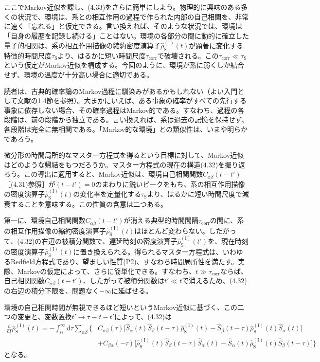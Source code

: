 \hypertarget{srcpage:163}{}\label{srcpage:163}
ここでMarkov近似を課し、(4.33)をさらに簡単にしよう。物理的に興味のある多くの状況で、環境は、系との相互作用の過程で作られた内部の自己相関を、非常に速く「忘れる」と仮定できる。言い換えれば、そのような状況では、環境は「自身の履歴を記録し続ける」ことはない。環境の各部分の間に動的に確立した量子的相関は、系の相互作用描像の縮約密度演算子$\hat\rho^{(\mathrm I)}_{\mathrm S}(t)$が顕著に変化する特徴的時間尺度$\tau_{\mathrm S}$より、はるかに短い時間尺度$\tau_{\mathrm{corr}}$で破壊される。この$\tau_{\mathrm{corr}}\ll\tau_{\mathrm S}$という仮定がMarkov近似を構成する。今回のように、環境が系に弱くしか結合せず、環境の温度が十分高い場合に適切である。

読者は、古典的確率論のMarkov過程に馴染みがあるかもしれない（よい入門として文献\cite{ref018}の1.4節を参照）。大まかにいえば、ある事象の確率がすべての先行する事象に依存しない場合、その確率過程はMarkov的である。すなわち、過程の各段階は、前の段階から独立である。言い換えれば、系は過去の記憶を保持せず、各段階は完全に無相関である。「Markov的な環境」との類似性は、いまや明らかであろう。

微分形の時間局所的なマスター方程式を得るという目標に対して、Markov近似はどのような帰結をもつだろうか。マスター方程式の現在の構造(4.32)を振り返ろう。この導出に適用すると、Markov近似は、環境自己相関関数$C_{\alpha\beta}(t-t')$［(4.31)参照］が$(t-t')=0$のまわりに鋭いピークをもち、系の相互作用描像の密度演算子$\hat\rho^{(\mathrm I)}_{\mathrm S}(t)$の変化率を定量化する$\tau_{\mathrm S}$より、はるかに短い時間尺度で減衰することを意味する。この性質の含意は二つある。

第一に、環境自己相関関数$C_{\alpha\beta}(t-t')$が消える典型的時間間隔$\tau_{\mathrm{corr}}$の間に、系の相互作用描像の縮約密度演算子$\hat\rho^{(\mathrm I)}_{\mathrm S}(t)$はほとんど変わらない。したがって、(4.32)の右辺の被積分関数で、遅延時刻の密度演算子$\hat\rho^{(\mathrm I)}_{\mathrm S}(t')$を、現在時刻の密度演算子$\hat\rho^{(\mathrm I)}_{\mathrm S}(t)$に置き換えられる。得られるマスター方程式は、いわゆるRedfield方程式\cite{ref174,ref175}であり、望ましい性質(P2)、すなわち時間局所性を満たす。実際、Markovの仮定によって、さらに簡単化できる。すなわち、$t\gg\tau_{\mathrm{corr}}$ならば、自己相関関数$C_{\alpha\beta}(t-t')$、したがって被積分関数は$t'\ll t$で消えるため、(4.32)の右辺の積分下限を、問題なく$-\infty$に延ばせる。

環境の自己相関時間が無視できるほど短いというMarkov近似に基づく、この二つの変更と、変数置換$t'\longrightarrow\tau\equiv t-t'$によって、(4.32)は
\begin{equation}
\begin{aligned}
\frac{\mathrm d}{\mathrm dt}\hat\rho^{(\mathrm I)}_{\mathrm S}(t)
=-\int_0^\infty\mathrm d\tau\sum_{\alpha\beta}\Big\{&C_{\alpha\beta}(\tau)
\big[\hat S_\alpha(t)\hat S_\beta(t-\tau)\hat\rho^{(\mathrm I)}_{\mathrm S}(t)
-\hat S_\beta(t-\tau)\hat\rho^{(\mathrm I)}_{\mathrm S}(t)\hat S_\alpha(t)\big]\\
&+C_{\beta\alpha}(-\tau)
\big[\hat\rho^{(\mathrm I)}_{\mathrm S}(t)\hat S_\beta(t-\tau)\hat S_\alpha(t)
-\hat S_\alpha(t)\hat\rho^{(\mathrm I)}_{\mathrm S}(t)\hat S_\beta(t-\tau)\big]\Big\}
\end{aligned}\tag{4.34}
\end{equation}
となる。

